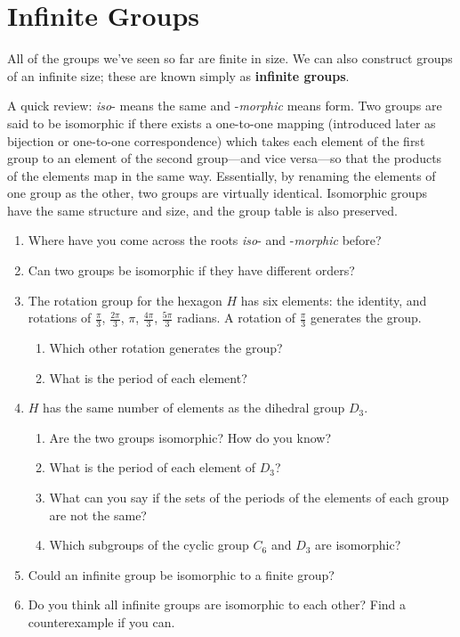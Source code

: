 \documentclass[../gatm.tex]{subfiles}
\begin{document}
\section{Infinite Groups}


All of the groups we've seen so far are finite in size. We can also construct groups of an infinite size; these are known simply as \textbf{infinite groups}.

A quick review: \textit{iso}- means the same and -\textit{morphic} means form. Two groups are said to be isomorphic if there exists a one-to-one mapping (introduced later as bijection or one-to-one correspondence) which takes each element of the first group to an element of the second group---and vice versa---so that the products of the elements map in the same way. Essentially, by renaming the elements of one group as the other, two groups are virtually identical. Isomorphic groups have the same structure and size, and the group table is also preserved.

\begin{enumerate}
\item Where have you come across the roots \textit{iso}- and -\textit{morphic} before?
\item Can two groups be isomorphic if they have different orders?
\item The rotation group for the hexagon $H$ has six elements: the identity, and rotations of $\frac{\pi}{3}$, $\frac{2\pi}{3}$, $\pi$, $\frac{4\pi}{3}$, $\frac{5\pi}{3}$ radians. A rotation of $\frac{\pi}{3}$ generates the group.
\begin{enumerate}
\item Which other rotation generates the group?
\item What is the period of each element?
\end{enumerate}
\item $H$ has the same number of elements as the dihedral group $D_3$. 
\begin{enumerate}
\item Are the two groups isomorphic? How do you know?
\item What is the period of each element of $D_3$?
\item What can you say if the sets of the periods of the elements of each group are not the same?
\item Which subgroups of the cyclic group $C_6$ and $D_3$ are isomorphic?
\end{enumerate}
\item Could an infinite group be isomorphic to a finite group?
\item Do you think all infinite groups are isomorphic to each other? Find a counterexample if you can.
\setcounter{inf_problem_i}{\value{enumi}}
\end{enumerate}
\end{document}
